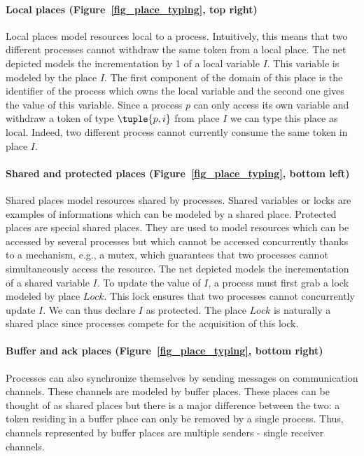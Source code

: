 \paragraph{Local places (Figure~\ref{fig_place_typing}, top right)}
Local places model resources local to a process. Intuitively, this
means that two different processes cannot withdraw the same token from
a local place. The net depicted models the incrementation by 1 of a
local variable $I$. This variable is modeled by the place $I$. The
first component of the domain of this place is the identifier of the
process which owns the local variable and the second one gives the
value of this variable. Since a process $p$ can only access its own
variable and withdraw a token of type $\tuple{p,i}$ from place $I$ we
can type this place as local. Indeed, two different process cannot
currently consume the same token in place $I$.

\paragraph{Shared and protected places (Figure~\ref{fig_place_typing}, bottom left)}
Shared places model resources shared by processes. Shared variables or
locks are examples of informations which can be modeled by a shared
place. Protected places are special shared places. They are used to
model resources which can be accessed by several processes but which
cannot be accessed concurrently thanks to a mechanism, e.g., a mutex,
which guarantees that two processes cannot simultaneously access the
resource.  The net depicted models the incrementation of a shared
variable $I$. To update the value of $I$, a process must first grab a
lock modeled by place $Lock$. This lock ensures that two processes
cannot concurrently update $I$. We can thus declare $I$ as
protected. The place $Lock$ is naturally a shared place since
processes compete for the acquisition of this lock.

\paragraph{Buffer and ack places (Figure~\ref{fig_place_typing}, bottom right)}
Processes can also synchronize themselves by sending messages on
communication channels. These channels are modeled by buffer
places. These places can be thought of as shared places but there is a
major difference between the two: a token residing in a buffer place
can only be removed by a single process. Thus, channels represented by
buffer places are multiple senders - single receiver channels.

